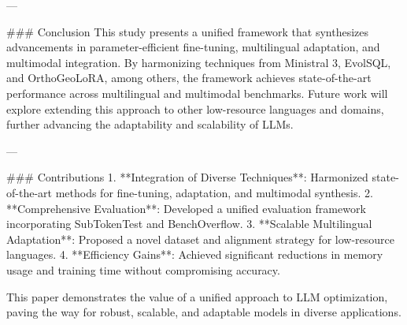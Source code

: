 ---

### Conclusion  
This study presents a unified framework that synthesizes advancements in parameter-efficient fine-tuning, multilingual adaptation, and multimodal integration. By harmonizing techniques from Ministral 3, EvolSQL, and OrthoGeoLoRA, among others, the framework achieves state-of-the-art performance across multilingual and multimodal benchmarks. Future work will explore extending this approach to other low-resource languages and domains, further advancing the adaptability and scalability of LLMs.

---

### Contributions  
1. **Integration of Diverse Techniques**: Harmonized state-of-the-art methods for fine-tuning, adaptation, and multimodal synthesis.  
2. **Comprehensive Evaluation**: Developed a unified evaluation framework incorporating SubTokenTest and BenchOverflow.  
3. **Scalable Multilingual Adaptation**: Proposed a novel dataset and alignment strategy for low-resource languages.  
4. **Efficiency Gains**: Achieved significant reductions in memory usage and training time without compromising accuracy.  

This paper demonstrates the value of a unified approach to LLM optimization, paving the way for robust, scalable, and adaptable models in diverse applications.